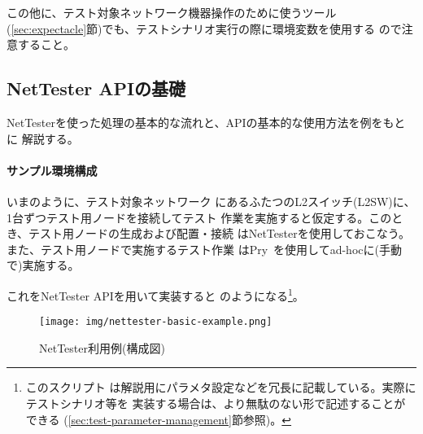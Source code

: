 この他に、テスト対象ネットワーク機器操作のために使うツール
(\ref{sec:expectacle}節)でも、テストシナリオ実行の際に環境変数を使用する
ので注意すること。

  \subsection{NetTester APIの基礎}
  \label{sec:nettester-api-basics}

NetTesterを使った処理の基本的な流れと、APIの基本的な使用方法を例をもとに
解説する。

\paragraph{サンプル環境構成}

いまのように、テスト対象ネットワーク
にあるふたつのL2スイッチ(L2SW)に、1台ずつテスト用ノードを接続してテスト
作業を実施すると仮定する。このとき、テスト用ノードの生成および配置・接続
はNetTesterを使用しておこなう。また、テスト用ノードで実施するテスト作業
はPry~\cite{pry}を使用してad-hocに(手動で)実施する。

これをNetTester APIを用いて実装すると
のようになる\footnote{このスクリプト
は解説用にパラメタ設定などを冗長に記載している。実際にテストシナリオ等を
実装する場合は、より無駄のない形で記述することができる
(\ref{sec:test-parameter-management}節参照)。}。

\begin{figure}[h]
 \centering
 \texttt{[image: img/nettester-basic-example.png]}
 \caption{NetTester利用例(構成図)}
 \label{fig:nettester-basic-example}
\end{figure}


